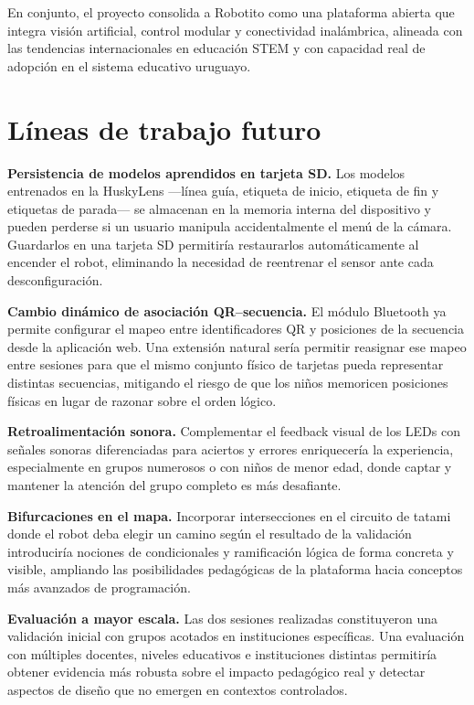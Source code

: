 \documentclass{prgrado}
\begin{document}
En conjunto, el proyecto consolida a Robotito como una plataforma abierta que integra visión artificial, control modular y conectividad inalámbrica, alineada con las tendencias internacionales en educación STEM y con capacidad real de adopción en el sistema educativo uruguayo.

\section{Líneas de trabajo futuro}

\textbf{Persistencia de modelos aprendidos en tarjeta SD.} Los modelos entrenados en la HuskyLens ---línea guía, etiqueta de inicio, etiqueta de fin y etiquetas de parada--- se almacenan en la memoria interna del dispositivo y pueden perderse si un usuario manipula accidentalmente el menú de la cámara. Guardarlos en una tarjeta SD permitiría restaurarlos automáticamente al encender el robot, eliminando la necesidad de reentrenar el sensor ante cada desconfiguración.

\textbf{Cambio dinámico de asociación QR--secuencia.} El módulo Bluetooth ya permite configurar el mapeo entre identificadores QR y posiciones de la secuencia desde la aplicación web. Una extensión natural sería permitir reasignar ese mapeo entre sesiones para que el mismo conjunto físico de tarjetas pueda representar distintas secuencias, mitigando el riesgo de que los niños memoricen posiciones físicas en lugar de razonar sobre el orden lógico.

\textbf{Retroalimentación sonora.} Complementar el feedback visual de los LEDs con señales sonoras diferenciadas para aciertos y errores enriquecería la experiencia, especialmente en grupos numerosos o con niños de menor edad, donde captar y mantener la atención del grupo completo es más desafiante.

\textbf{Bifurcaciones en el mapa.} Incorporar intersecciones en el circuito de tatami donde el robot deba elegir un camino según el resultado de la validación introduciría nociones de condicionales y ramificación lógica de forma concreta y visible, ampliando las posibilidades pedagógicas de la plataforma hacia conceptos más avanzados de programación.

\textbf{Evaluación a mayor escala.} Las dos sesiones realizadas constituyeron una validación inicial con grupos acotados en instituciones específicas. Una evaluación con múltiples docentes, niveles educativos e instituciones distintas permitiría obtener evidencia más robusta sobre el impacto pedagógico real y detectar aspectos de diseño que no emergen en contextos controlados.
 
\end{document}
